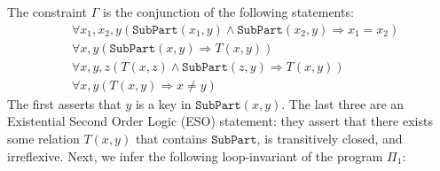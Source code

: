 \begin{ex}
%
%
  The constraint $\Gamma$ is the conjunction of the following statements:
%
  \begin{align}
    & \forall x_1, x_2, y \left(\texttt{SubPart}(x_1,y) \wedge \texttt{SubPart}(x_2,y) \Rightarrow x_1=x_2\right) \label{eq:gamma:key}\\
    & \forall x,y\left(\texttt{SubPart}(x,y) \Rightarrow T(x,y)\right) \label{eq:gamma:et}\\
    & \forall x,y,z\left(T(x,z) \wedge \texttt{SubPart}(z,y) \Rightarrow T(x,y)\right)\label{eq:gamma:tc}\\
    & \forall x,y\left(T(x,y) \Rightarrow x\neq y\right) \label{eq:gamma:neq}
  \end{align}
%
  The first asserts that $y$ is a key in $\texttt{SubPart}(x,y)$.  The
  last three are an Existential Second Order Logic (ESO) statement: they assert that
  there exists some relation $T(x,y)$ that contains
  $\texttt{SubPart}$, is transitively closed, and irreflexive.
  Next, we infer the following loop-invariant of the program $\Pi_1$:
%
  \begin{align}

\end{align}
\end{ex}
